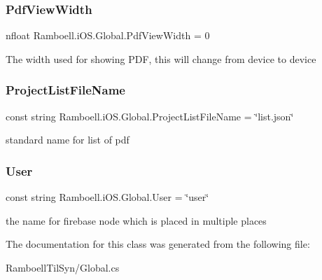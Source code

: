 \subsubsection{\texorpdfstring{Pdf\+View\+Width}{PdfViewWidth}}
{\footnotesize\ttfamily nfloat Ramboell.\+i\+O\+S.\+Global.\+Pdf\+View\+Width = 0\hspace{0.3cm}{\ttfamily [static]}}



The width used for showing P\+DF, this will change from device to device 

\mbox{\label{class_ramboell_1_1i_o_s_1_1_global_a23d8cd28e3aa412d459934cd1ec82a74}} 
\subsubsection{\texorpdfstring{Project\+List\+File\+Name}{ProjectListFileName}}
{\footnotesize\ttfamily const string Ramboell.\+i\+O\+S.\+Global.\+Project\+List\+File\+Name = \char`\"{}list.\+json\char`\"{}}



standard name for list of pdf 

\mbox{\label{class_ramboell_1_1i_o_s_1_1_global_a30a6ccae88af77bbaacd121b7c707a73}} 
\subsubsection{\texorpdfstring{User}{User}}
{\footnotesize\ttfamily const string Ramboell.\+i\+O\+S.\+Global.\+User = \char`\"{}user\char`\"{}}



the name for firebase node which is placed in multiple places 



The documentation for this class was generated from the following file\+:\begin{DoxyCompactItemize}
\item 
Ramboell\+Til\+Syn/Global.\+cs\end{DoxyCompactItemize}

